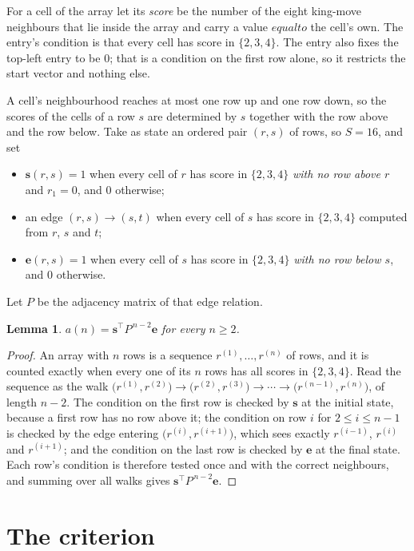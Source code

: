 \documentclass[11pt,a4paper]{article}
\theoremstyle{plain}
\newtheorem{lemma}[theorem]{Lemma}
\theoremstyle{definition}
\begin{document}
For a cell of the array let its \emph{score} be the number of the eight king-move neighbours that lie inside
the array and carry a value $equal to$ the cell's own. The entry's condition is that every cell
has score in $\{2,3,4\}$. The entry also fixes the top-left entry to be $0$; that is a condition on the first row alone, so it restricts the start vector and nothing else.

A cell's neighbourhood reaches at most one row up and one row down, so the scores of the
cells of a row $s$ are determined by $s$ together with the row above and the row below.
Take as state an ordered pair $(r,s)$ of rows, so $S=16$, and set
\begin{itemize}
\item $\mathbf{s}(r,s)=1$ when every cell of $r$ has score in $\{2,3,4\}$ \emph{with no row
above $r$} and $r_1=0$, and $0$ otherwise;
\item an edge $(r,s)\to(s,t)$ when every cell of $s$ has score in $\{2,3,4\}$ computed from
$r$, $s$ and $t$;
\item $\mathbf{e}(r,s)=1$ when every cell of $s$ has score in $\{2,3,4\}$ \emph{with no row
below $s$}, and $0$ otherwise.
\end{itemize}
Let $P$ be the adjacency matrix of that edge relation.

\begin{lemma}\label{lem:walk}
$a(n)=\mathbf{s}^{\!\top}P^{\,n-2}\mathbf{e}$ for every $n\ge2$.
\end{lemma}

\begin{proof}
An array with $n$ rows is a sequence $r^{(1)},\dots,r^{(n)}$ of rows, and it is counted
exactly when every one of its $n$ rows has all scores in $\{2,3,4\}$. Read the sequence as the
walk $\bigl(r^{(1)},r^{(2)}\bigr)\to\bigl(r^{(2)},r^{(3)}\bigr)\to\cdots\to
\bigl(r^{(n-1)},r^{(n)}\bigr)$, of length $n-2$. The condition on the first row is
checked by $\mathbf{s}$ at the initial state, because a first row has no row above it; the
condition on row $i$ for $2\le i\le n-1$ is checked by the edge entering
$\bigl(r^{(i)},r^{(i+1)}\bigr)$, which sees exactly $r^{(i-1)}$, $r^{(i)}$ and
$r^{(i+1)}$; and the condition on the last row is checked by $\mathbf{e}$ at the final
state. Each row's condition is therefore tested once and with the correct neighbours, and
summing over all walks gives $\mathbf{s}^{\!\top}P^{\,n-2}\mathbf{e}$.
\end{proof}

\section{The criterion}
\end{document}
